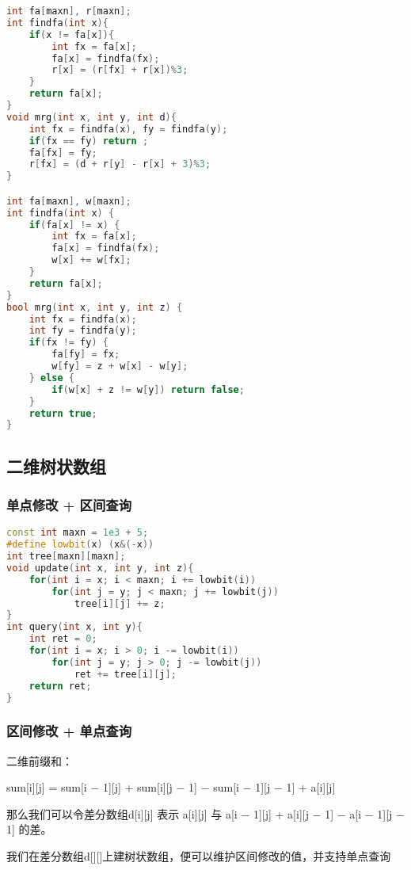 \begin{lstlisting}[language=C++]
int fa[maxn], r[maxn];
int findfa(int x){
    if(x != fa[x]){
        int fx = fa[x];
        fa[x] = findfa(fx);
        r[x] = (r[fx] + r[x])%3;
    }
    return fa[x];
}
void mrg(int x, int y, int d){
    int fx = findfa(x), fy = findfa(y);
    if(fx == fy) return ;
    fa[fx] = fy;
    r[fx] = (d + r[y] - r[x] + 3)%3;
}

int fa[maxn], w[maxn];
int findfa(int x) {
    if(fa[x] != x) {
        int fx = fa[x];
        fa[x] = findfa(fx);
        w[x] += w[fx];
    }
    return fa[x];
}
bool mrg(int x, int y, int z) {
    int fx = findfa(x);
    int fy = findfa(y);
    if(fx != fy) {
        fa[fy] = fx;
        w[fy] = z + w[x] - w[y];
    } else {
        if(w[x] + z != w[y]) return false;
    }
    return true;
}
\end{lstlisting}

\subsection{二维树状数组}

\subsubsection{单点修改 + 区间查询}

\begin{lstlisting}[language=C++]
const int maxn = 1e3 + 5;
#define lowbit(x) (x&(-x))
int tree[maxn][maxn];
void update(int x, int y, int z){
    for(int i = x; i < maxn; i += lowbit(i))
        for(int j = y; j < maxn; j += lowbit(j))
            tree[i][j] += z;
}
int query(int x, int y){
    int ret = 0;
    for(int i = x; i > 0; i -= lowbit(i))
        for(int j = y; j > 0; j -= lowbit(j))
            ret += tree[i][j];
    return ret;
}
\end{lstlisting}

\subsubsection{区间修改 + 单点查询}

二维前缀和：

sum[i][j] = sum[i − 1][j] + sum[i][j − 1] − sum[i − 1][j − 1] + a[i][j]

那么我们可以令差分数组d[i][j] 表示 a[i][j] 与 a[i − 1][j] + a[i][j − 1] − a[i − 1][j − 1] 的差。

我们在差分数组d[][]上建树状数组，便可以维护区间修改的值，并支持单点查询

